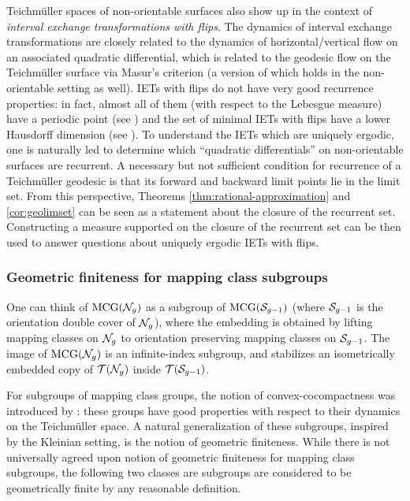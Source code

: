 Teichm\"uller spaces of non-orientable surfaces also show up in the context of \emph{interval exchange transformations with flips}.
The dynamics of interval exchange transformations are closely related to the dynamics of horizontal/vertical flow on an associated quadratic differential, which is related to the geodesic flow on the Teichm\"uller surface via Masur's criterion (a version of which holds in the non-orientable setting as well).
IETs with flips do not have very good recurrence properties: in fact, almost all of them (with respect to the Lebesgue measure) have a periodic point (see \cite{nogueira_1989}) and the set of minimal IETs with flips have a lower Hausdorff dimension (see \cite{skripchenko2018hausdorff}).
To understand the IETs which are uniquely ergodic, one is naturally led to determine which ``quadratic differentials'' on non-orientable surfaces are recurrent.
A necessary but not sufficient condition for recurrence of a Teichm\"uller geodesic is that its forward and backward limit points lie in the limit set.
From this perspective, Theorems \ref{thm:rational-approximation} and \ref{cor:geolimset} can
be seen as a statement about the closure of the recurrent set.
Constructing a measure supported on the closure of the recurrent set can be then used to answer questions about uniquely ergodic IETs with flips.

\subsubsection*{Geometric finiteness for mapping class subgroups}

One can think of $\mathrm{MCG}(\mathcal{N}_g)$ as a subgroup of $\mathrm{MCG}(\mathcal{S}_{g-1})$ (where $\mathcal{S}_{g-1}$ is the orientation double cover of $\mathcal{N}_g$), where the embedding is obtained by lifting mapping classes on $\mathcal{N}_g$ to orientation preserving mapping classes on $\mathcal{S}_{g-1}$.
The image of $\mathrm{MCG}(\mathcal{N}_g)$ is an infinite-index subgroup, and stabilizes an isometrically embedded copy of $\mathcal{T}(\mathcal{N}_g)$ inside $\mathcal{T}(\mathcal{S}_{g-1})$.

For subgroups of mapping class groups, the notion of convex-cocompactness was introduced by \textcite{farb2002convex}: these groups have good properties with respect to their dynamics on the Teichmüller space.
A natural generalization of these subgroups, inspired by the Kleinian setting, is the notion of geometric finiteness.
While there is not universally agreed upon notion of geometric finiteness for mapping class subgroups, the following two classes are subgroups are considered to be geometrically finite by any reasonable definition.

